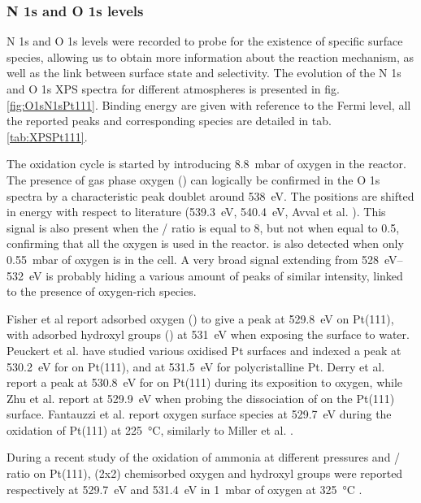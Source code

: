 \subsubsection{N 1s and O 1s levels}

N 1s and O 1s levels were recorded to probe for the existence of specific surface species, allowing us to obtain more information about the reaction mechanism, as well as the link between surface state and selectivity.
The evolution of the N 1s and O 1s XPS spectra for different atmospheres is presented in fig. \ref{fig:O1sN1sPt111}.
Binding energy are given with reference to the Fermi level, all the reported peaks and corresponding species are detailed in tab. \ref{tab:XPSPt111}.

The oxidation cycle is started by introducing \qty{8.8}{\milli\bar} of oxygen in the reactor.
The presence of gas phase oxygen () can logically be confirmed in the O 1s spectra by a characteristic peak doublet around \qty{538}{\eV}.
The positions are shifted in energy with respect to literature (\qty{539.3}{\eV}, \qty{540.4}{\eV}, Avval et al. \cite{Avval2022}).
This signal is also present when the / ratio is equal to 8, but not when equal to 0.5, confirming that all the oxygen is used in the reactor.
 is also detected when only \qty{0.55}{\milli\bar} of oxygen is in the cell.
A very broad signal extending from \qtyrange{528}{532}{\eV} is probably hiding a various amount of peaks of similar intensity, linked to the presence of oxygen-rich species.

Fisher et al \parencite*{Fisher1980} report adsorbed oxygen () to give a peak at \qty{529.8}{\eV} on Pt(111), with adsorbed hydroxyl groups () at \qty{531}{\eV} when exposing the surface to water.
Peuckert et al. \parencite*{Peuckert1984} have studied various oxidised Pt surfaces and indexed a peak at \qty{530.2}{\eV} for  on Pt(111), and  at \qty{531.5}{\eV} for polycristalline Pt.
Derry et al. \parencite*{Derry1984} report a peak at \qty{530.8}{\eV} for  on Pt(111) during its exposition to oxygen, while Zhu et al. \parencite*{Zhu2003} report  at \qty{529.9}{\eV} when probing the dissociation of  on the Pt(111) surface.
Fantauzzi et al. \parencite*{Fantauzzi2017} report oxygen surface species at \qty{529.7}{\eV} during the oxidation of Pt(111) at \qty{225}{\degreeCelsius}, similarly to Miller et al. \parencite*{Miller2014}.

During a recent study of the oxidation of ammonia at different pressures and / ratio on Pt(111), (2x2) chemisorbed oxygen and hydroxyl groups were reported respectively at \qty{529.7}{\eV} and \qty{531.4}{\eV} in \qty{1}{\milli\bar} of oxygen at \qty{325}{\degreeCelsius} \parencite{Ivashenko2021}.


